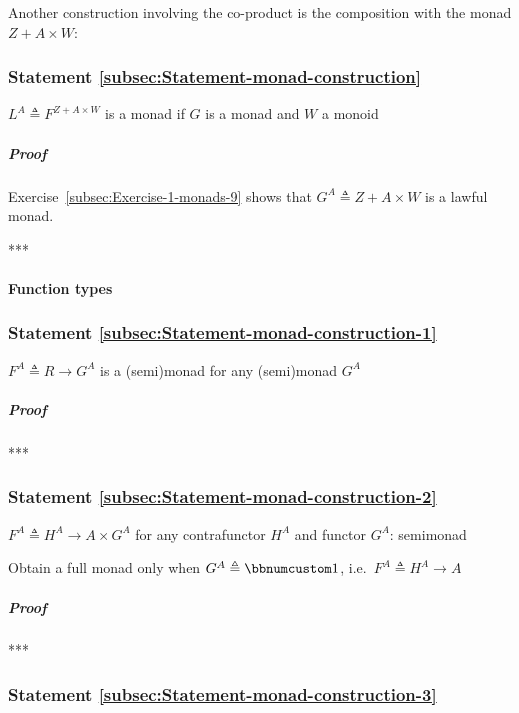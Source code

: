 Another construction involving the co-product is the composition with
the monad $Z+A\times W$:

\subsubsection{Statement \label{subsec:Statement-monad-construction}\ref{subsec:Statement-monad-construction}}

$L^{A}\triangleq F^{Z+A\times W}$ is a monad if $G$ is a monad and
$W$ a monoid

\subparagraph{Proof}

Exercise~\ref{subsec:Exercise-1-monads-9} shows that $G^{A}\triangleq Z+A\times W$
is a lawful monad.

{*}{*}{*}

\paragraph{Function types}

\subsubsection{Statement \label{subsec:Statement-monad-construction-1}\ref{subsec:Statement-monad-construction-1}}

$F^{A}\triangleq R\rightarrow G^{A}$ is a (semi)monad for any (semi)monad
$G^{A}$

\subparagraph{Proof}

{*}{*}{*}

\subsubsection{Statement \label{subsec:Statement-monad-construction-2}\ref{subsec:Statement-monad-construction-2}}

$F^{A}\triangleq H^{A}\rightarrow A\times G^{A}$ for any contrafunctor
$H^{A}$ and functor $G^{A}$: semimonad

Obtain a full monad only when $G^{A}\triangleq\bbnum 1$, i.e.\ $F^{A}\triangleq H^{A}\rightarrow A$

\subparagraph{Proof}

{*}{*}{*}

\subsubsection{Statement \label{subsec:Statement-monad-construction-3}\ref{subsec:Statement-monad-construction-3}}

